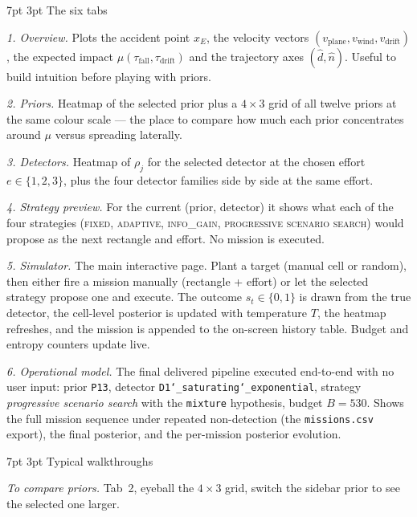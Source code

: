 \documentclass[11pt,a4paper]{article}
\makeatletter
\renewcommand\section{\@startsection{section}{1}{\z@}%
                                    {7pt \@plus 1pt \@minus 1pt}%
                                    {3pt}%
                                    {\normalfont\normalsize\bfseries}}
\makeatother
\begin{document}
\section{The six tabs}

\textit{1. Overview.} Plots the accident point $x_E$, the velocity vectors
$(v_{\mathrm{plane}}, v_{\mathrm{wind}}, v_{\mathrm{drift}})$, the expected
impact $\mu(\tau_{\mathrm{fall}}, \tau_{\mathrm{drift}})$ and the
trajectory axes $(\hat d, \hat n)$. Useful to build intuition before
playing with priors.

\textit{2. Priors.} Heatmap of the selected prior plus a $4{\times}3$ grid
of all twelve priors at the same colour scale --- the place to compare how
much each prior concentrates around $\mu$ versus spreading laterally.

\textit{3. Detectors.} Heatmap of $\rho_j$ for the selected detector at
the chosen effort $e\in\{1,2,3\}$, plus the four detector families side by
side at the same effort.

\textit{4. Strategy preview.} For the current (prior, detector) it shows
what each of the four strategies (\textsc{fixed}, \textsc{adaptive},
\textsc{info\_gain}, \textsc{progressive scenario search}) would propose
as the next rectangle and effort. No mission is executed.

\textit{5. Simulator.} The main interactive page. Plant a target (manual
cell or random), then either fire a mission manually
(rectangle + effort) or let the selected strategy propose one and execute.
The outcome $s_t\in\{0,1\}$ is drawn from the true detector, the cell-level
posterior is updated with temperature $T$, the heatmap refreshes, and the
mission is appended to the on-screen history table. Budget and entropy
counters update live.

\textit{6. Operational model.} The final delivered pipeline executed
end-to-end with no user input: prior \texttt{P13}, detector
\texttt{D1\char`_saturating\char`_exponential}, strategy
\textit{progressive scenario search} with the \texttt{mixture} hypothesis,
budget $B=530$. Shows the full mission sequence under repeated
non-detection (the \texttt{missions.csv} export), the final posterior, and
the per-mission posterior evolution.

\section{Typical walkthroughs}

\textit{To compare priors.} Tab~2, eyeball the $4{\times}3$ grid, switch
the sidebar prior to see the selected one larger.
\end{document}
